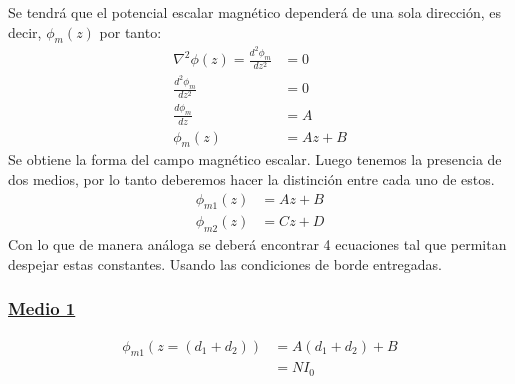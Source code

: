 \documentclass[
  11pt,
  letterpaper,
   addpoints,
   answers
  ]{exam}
\begin{document}
\begin{questions}
\begin{solution}
\begin{enumerate}
        Se tendrá que el potencial escalar magnético dependerá de una sola dirección, es decir, $\phi_{m}(z)$ por tanto:
        \begin{align}
            \nabla^{2} \phi(z) = \frac{d^{2} \phi_{m}}{dz^{2}} &= 0\\
            \frac{d^{2} \phi_{m}}{dz^{2}} &= 0\\
            \frac{d\phi_{m}}{dz} &= A\\
            \phi_{m}(z) &= Az + B
        \end{align}
        Se obtiene la forma del campo magnético escalar. Luego tenemos la presencia de dos medios, por lo tanto deberemos hacer la distinción entre cada uno de estos.
        \begin{align}
            \phi_{m1}(z) &= Az + B \\
            \phi_{m2}(z) &= Cz + D 
        \end{align}
        Con lo que de manera análoga se deberá encontrar 4 ecuaciones tal que permitan despejar estas constantes. Usando las condiciones de borde entregadas.
        \subsubsection*{\underline{Medio 1}}
        \begin{align}
            \phi_{m1}(z=(d_{1} + d_{2}))  &= A(d_{1} + d_{2}) + B \\&= N I_{0} 
        \end{align}

\end{enumerate}
\end{solution}
\end{questions}
\end{document}
